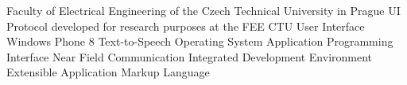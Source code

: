  Faculty of Electrical Engineering of the Czech Technical University in Prague
\abbrv[UIP]  UI Protocol developed for research purposes at the FEE CTU
\abbrv[UI]  User Interface
\abbrv[WP8] Windows Phone 8
\abbrv[TTS]  Text-to-Speech
\abbrv[OS]  Operating System
\abbrv[API]  Application Programming Interface
\abbrv[NFC]  Near Field Communication
\abbrv[IDE]  Integrated Development Environment
\abbrv[XAML] Extensible Application Markup Language
\stopAbbreviations

\endinput
